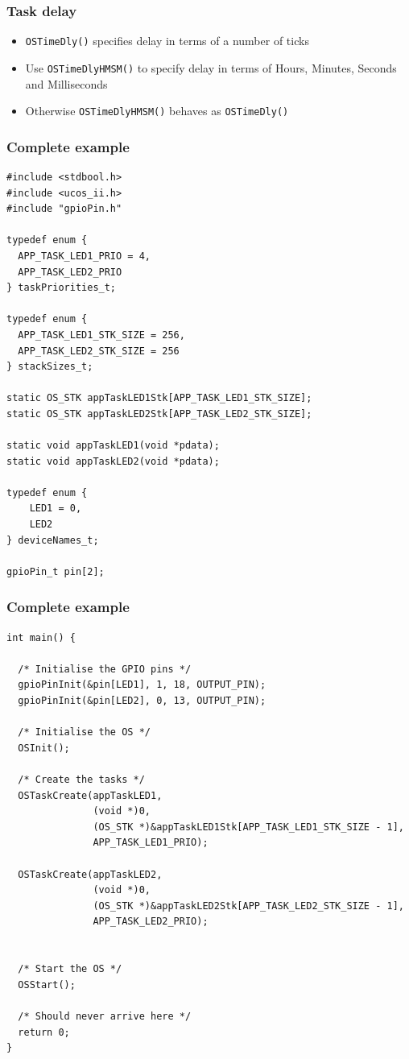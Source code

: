 \documentclass[hyperref={pdfpagelabels=false},svgnames]{beamer}
\begin{document}
\begin{frame}[fragile]
\frametitle{Task delay}
\begin{itemize}
\item \verb'OSTimeDly()' specifies delay in terms of a number of ticks
\item Use \verb'OSTimeDlyHMSM()' to specify delay in terms of \alert{H}ours,
 \alert{M}inutes, \alert{S}econds and \alert{M}illiseconds
\item Otherwise \verb'OSTimeDlyHMSM()' behaves as \verb'OSTimeDly()'
\end{itemize}
\end{frame}

\lstset{basicstyle=\tiny}


\begin{frame}[fragile]
\frametitle{Complete example}

\begin{lstlisting}
#include <stdbool.h>
#include <ucos_ii.h>
#include "gpioPin.h"

typedef enum {
  APP_TASK_LED1_PRIO = 4,
  APP_TASK_LED2_PRIO
} taskPriorities_t;

typedef enum {
  APP_TASK_LED1_STK_SIZE = 256,
  APP_TASK_LED2_STK_SIZE = 256
} stackSizes_t;

static OS_STK appTaskLED1Stk[APP_TASK_LED1_STK_SIZE];
static OS_STK appTaskLED2Stk[APP_TASK_LED2_STK_SIZE];

static void appTaskLED1(void *pdata);
static void appTaskLED2(void *pdata);

typedef enum {
	LED1 = 0,
	LED2
} deviceNames_t;

gpioPin_t pin[2];

\end{lstlisting}

\end{frame}

\begin{frame}[fragile]
\frametitle{Complete example}

\begin{lstlisting}
int main() {

  /* Initialise the GPIO pins */
  gpioPinInit(&pin[LED1], 1, 18, OUTPUT_PIN);
  gpioPinInit(&pin[LED2], 0, 13, OUTPUT_PIN);

  /* Initialise the OS */
  OSInit();                                                  

  /* Create the tasks */
  OSTaskCreate(appTaskLED1,                              
               (void *)0,
               (OS_STK *)&appTaskLED1Stk[APP_TASK_LED1_STK_SIZE - 1],
               APP_TASK_LED1_PRIO);
 
  OSTaskCreate(appTaskLED2,                              
               (void *)0,
               (OS_STK *)&appTaskLED2Stk[APP_TASK_LED2_STK_SIZE - 1],
               APP_TASK_LED2_PRIO);

 
  /* Start the OS */
  OSStart();                                                 
 
  /* Should never arrive here */
  return 0;     
}
\end{lstlisting}
\end{frame}
\end{document}
